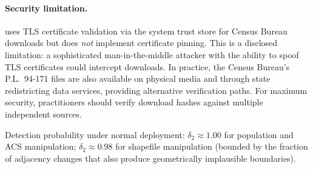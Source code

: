 \paragraph{Security limitation.}
\bisect{} uses TLS certificate validation via the system trust store for
Census Bureau downloads but does \emph{not} implement certificate pinning.
This is a disclosed limitation: a sophisticated man-in-the-middle attacker
with the ability to spoof TLS certificates could intercept downloads.
In practice, the Census Bureau's P.L.\ 94-171 files are also available
on physical media and through state redistricting data services, providing
alternative verification paths.
For maximum security, practitioners should verify download hashes against
multiple independent sources.

Detection probability under normal \dia{} deployment: $\delta_2 \approx 1.00$
for population and ACS manipulation; $\delta_2 \approx 0.98$ for shapefile
manipulation (bounded by the fraction of adjacency changes that also produce
geometrically implausible boundaries).

